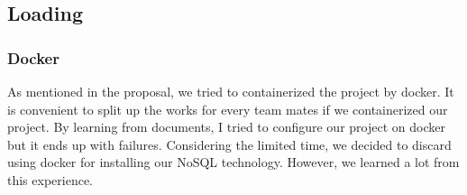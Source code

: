 \documentclass{article}
\begin{document}
\subsection{Loading}

\subsubsection{Docker}

As mentioned in the proposal, we tried to containerized the project by docker. It is convenient to split up the works for every team mates if we containerized our project. By learning from documents, I tried to configure our project on docker but it ends up with failures. Considering the limited time, we decided to discard using docker for installing our NoSQL technology. However, we learned a lot from this experience.
\end{document}

